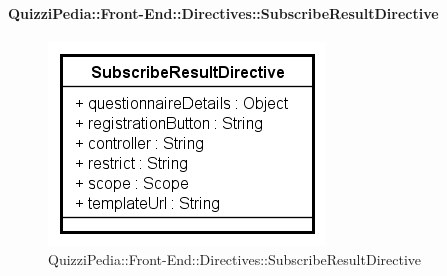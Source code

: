 \paragraph{QuizziPedia::Front-End::Directives::SubscribeResultDirective }

\label{QuizziPedia::Front-End::Directives::SubscribeResultDirective}

\begin{figure}[h]
	\centering
	\includegraphics[scale=0.80,keepaspectratio]{UML/Classi/Front-End/QuizziPedia_Front-end_Directives_SubscribeResultDirective.png}
	\caption{QuizziPedia::Front-End::Directives::SubscribeResultDirective}
\end{figure}

